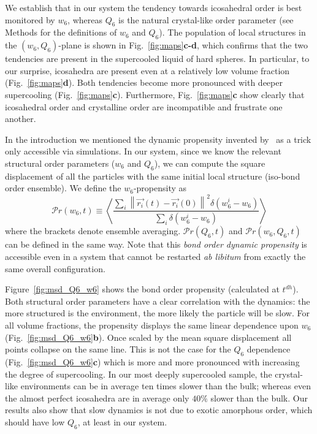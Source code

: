We establish that in our system the tendency towards icosahedral order is best monitored by $w_6$, whereas $Q_6$ is the natural crystal-like order parameter (see Methods for the definitions of $w_6$ and $Q_6$). The population of local structures in the $(w_6,Q_6)$-plane is shown in Fig.~\ref{fig:maps}\textbf{c-d}, which confirms that the two tendencies are present in the supercooled liquid of hard spheres. In particular, to our surprise, icosahedra are present even at a relatively low volume fraction (Fig.~\ref{fig:maps}\textbf{d}). Both tendencies become more pronounced with deeper supercooling (Fig.~\ref{fig:maps}\textbf{c}). Furthermore, Fig.~\ref{fig:maps}\textbf{c} show clearly that icosahedral order and crystalline order are incompatible and frustrate one another.



In the introduction we mentioned the dynamic propensity invented by~\citet{Widmer-Cooper2005} as a trick only accessible via simulations. In our system, since we know the relevant structural order parameters ($w_6$ and $Q_6$), we can compute the square displacement of all the particles with the same initial local structure (iso-bond order ensemble). We define the $w_6$-propensity as
\begin{equation}
	\mathcal{P}r(w_6, t) \equiv \left\langle \frac{
		\sum\limits_i{
			\left\|\vec{r_i}(t)-\vec{r_i}(0)\right\|^2 \delta(w_6^i-w_6)
			}
	}{
		\sum\limits_i{\delta(w_6^i-w_6)}
	}\right\rangle 
	\label{eq:bo_propensity}
\end{equation}
where the brackets denote ensemble averaging. $\mathcal{P}r(Q_6, t)$ and $\mathcal{P}r(w_6, Q_6, t)$ can be defined in the same way. Note that this \emph{bond order dynamic propensity} is accessible even in a system that cannot be restarted \emph{ab libitum} from exactly the same overall configuration.

Figure~\ref{fig:msd_Q6_w6} shows the bond order propensity (calculated at $t^{dh}$). Both structural order parameters have a clear correlation with the dynamics: the more structured is the environment, the more likely the particle will be slow. For all volume fractions, the propensity displays the same linear dependence upon $w_6$ (Fig.~\ref{fig:msd_Q6_w6}\textbf{b}). Once scaled by the mean square displacement all points collapse on the same line. This is not the case for the $Q_6$ dependence (Fig.~\ref{fig:msd_Q6_w6}\textbf{c}) which is more and more pronounced with increasing the degree of supercooling. In our most deeply supercooled sample, the crystal-like environments can be in average ten times slower than the bulk; whereas even the almost perfect icosahedra are in average only $40\%$ slower than the bulk. Our results also show that slow dynamics is not due to exotic amorphous order, which should have low $Q_6$, at least in our system. 

